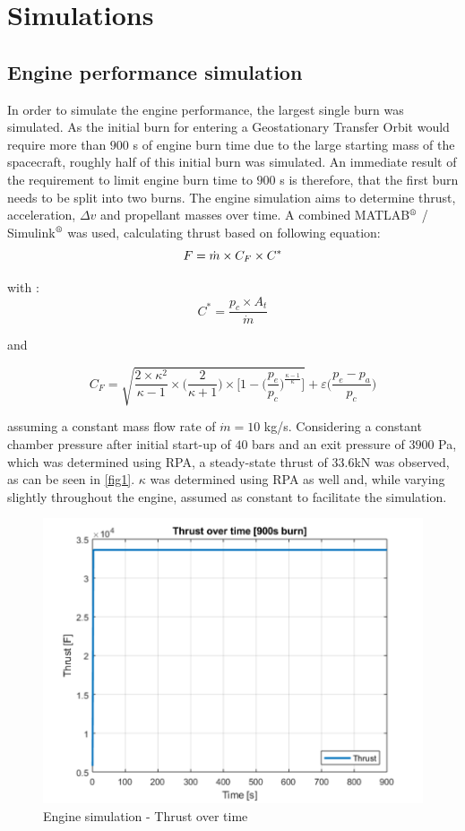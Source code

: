 \chapter{Simulations}
\section{Engine performance simulation}
\qquad In order to simulate the engine performance, the largest single burn was simulated. As the initial burn for entering a Geostationary Transfer Orbit would require more than $900$ s of engine burn time due to the large starting mass of the spacecraft, roughly half of this initial burn was simulated. An immediate result of the requirement to limit engine burn time to $900$ s is therefore, that the first burn needs to be split into two burns. The engine simulation aims to determine thrust, acceleration, $\Delta v$ and propellant masses over time. A combined MATLAB$^{\mbox{\scriptsize{\textregistered}}}$  / Simulink$^{\mbox{\scriptsize{\textregistered}}}$  was used, calculating thrust based on following equation:
\begin{equation}
	F = \dot m \times C_F \times C^*\\
\end{equation}

with : 
$$
C^* = \frac{p_c\times A_t}{\dot{m}}
$$

and

$$
C_F = \sqrt{\frac{2\times \kappa^2}{\kappa - 1}\times \bigg(\frac{2}{\kappa + 1}\bigg)\times\bigg[1 - \bigg(\frac{p_e}{p_c}\bigg)^{\frac{\kappa - 1}{\kappa}}\bigg]} + \varepsilon\bigg(\frac{p_e-p_a}{p_c}\bigg)
$$

assuming a constant mass flow rate of $\dot{m} = 10$ kg/s. Considering a constant chamber pressure after initial start-up of $40$ bars and an exit pressure of $3900$ Pa, which was determined using RPA, a steady-state thrust of $33.6$kN was observed, as can be seen in \autoref{fig1}. $\kappa$ was determined using RPA as well and, while varying slightly throughout the engine, assumed as constant to facilitate the simulation.

\begin{figure}[H]
	\centering\includegraphics[width=0.9\linewidth]{thrusttime}
	\caption{Engine simulation - Thrust over time}\label{fig1}
\end{figure}


